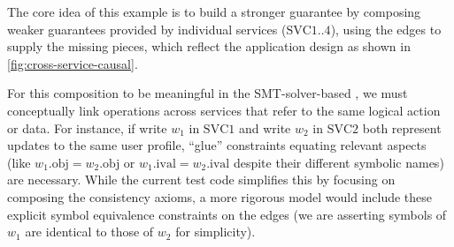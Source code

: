 The core idea of this example is to build a stronger guarantee by composing
weaker guarantees provided by individual services ($\text{SVC}1..4$), using
the edges to supply the missing pieces, which reflect the application design
as shown in \cref{fig:cross-service-causal}.


For this composition to be meaningful in the SMT-solver-based
\sysname{}, we must
conceptually link operations across services that refer to the same logical
action or data. For instance, if write $w_1$ in $\text{SVC}1$ and
write $w_2$ in $\text{SVC}2$ both
represent updates to the same user profile, ``glue'' constraints
equating relevant
aspects (like $w_1.\text{obj} = w_2.\text{obj}$ or $w_1.\text{ival} =
w_2.\text{ival}$ despite their different symbolic names) are necessary.
While the current test code
simplifies this by focusing on composing the consistency axioms, a more rigorous
model would include these explicit symbol equivalence constraints on the edges
(we are asserting symbols of $w_1$ are identical to those of $w_2$ for
simplicity).


